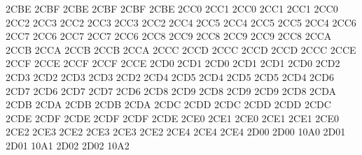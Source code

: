 \setcclcuc 2CBE 2CBF 2CBE %
\setcclcuc 2CBF 2CBF 2CBE %
\setcclcuc 2CC0 2CC1 2CC0 %
\setcclcuc 2CC1 2CC1 2CC0 %
\setcclcuc 2CC2 2CC3 2CC2 %
\setcclcuc 2CC3 2CC3 2CC2 %
\setcclcuc 2CC4 2CC5 2CC4 %
\setcclcuc 2CC5 2CC5 2CC4 %
\setcclcuc 2CC6 2CC7 2CC6 %
\setcclcuc 2CC7 2CC7 2CC6 %
\setcclcuc 2CC8 2CC9 2CC8 %
\setcclcuc 2CC9 2CC9 2CC8 %
\setcclcuc 2CCA 2CCB 2CCA %
\setcclcuc 2CCB 2CCB 2CCA %
\setcclcuc 2CCC 2CCD 2CCC %
\setcclcuc 2CCD 2CCD 2CCC %
\setcclcuc 2CCE 2CCF 2CCE %
\setcclcuc 2CCF 2CCF 2CCE %
\setcclcuc 2CD0 2CD1 2CD0 %
\setcclcuc 2CD1 2CD1 2CD0 %
\setcclcuc 2CD2 2CD3 2CD2 %
\setcclcuc 2CD3 2CD3 2CD2 %
\setcclcuc 2CD4 2CD5 2CD4 %
\setcclcuc 2CD5 2CD5 2CD4 %
\setcclcuc 2CD6 2CD7 2CD6 %
\setcclcuc 2CD7 2CD7 2CD6 %
\setcclcuc 2CD8 2CD9 2CD8 %
\setcclcuc 2CD9 2CD9 2CD8 %
\setcclcuc 2CDA 2CDB 2CDA %
\setcclcuc 2CDB 2CDB 2CDA %
\setcclcuc 2CDC 2CDD 2CDC %
\setcclcuc 2CDD 2CDD 2CDC %
\setcclcuc 2CDE 2CDF 2CDE %
\setcclcuc 2CDF 2CDF 2CDE %
\setcclcuc 2CE0 2CE1 2CE0 %
\setcclcuc 2CE1 2CE1 2CE0 %
\setcclcuc 2CE2 2CE3 2CE2 %
\setcclcuc 2CE3 2CE3 2CE2 %
\setcclcuc 2CE4 2CE4 2CE4 %
\setcclcuc 2D00 2D00 10A0 %
\setcclcuc 2D01 2D01 10A1 %
\setcclcuc 2D02 2D02 10A2 %
